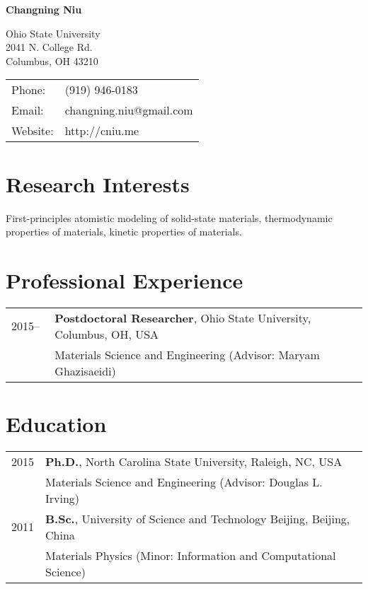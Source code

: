 \documentclass[letterpaper,11pt]{article}
\def\name{Changning Niu}
\begin{document}
\thispagestyle{empty}
\centerline{\huge \bf \sc \name}

\vspace{0.25in}

\begin{minipage}{0.50\linewidth}
  Ohio State University \\
  2041 N. College Rd.\\
  Columbus, OH 43210
\end{minipage}
\begin{minipage}{0.50\linewidth}
  \begin{tabular}{ll}
    Phone: & (919) 946-0183 \\
    Email: & changning.niu@gmail.com \\
    Website: & http://cniu.me \\
  \end{tabular}
\end{minipage}


\section*{Research Interests}

First-principles atomistic modeling of solid-state materials, thermodynamic properties of materials, kinetic properties of materials.

\section*{Professional Experience}

\begin{tabular}{ll}
2015--\,\,  & \textbf{Postdoctoral Researcher}, Ohio State University, Columbus, OH, USA \\
		   & Materials Science and Engineering (Advisor: Maryam Ghazisaeidi)
\end{tabular}


\section*{Education}

\begin{tabular}{ll}
	2015 & {\bf Ph.D.}, North Carolina State University, Raleigh, NC, USA \\
	     & Materials Science and Engineering (Advisor: Douglas L. Irving) \\
	2011 & {\bf B.Sc.}, University of Science and Technology Beijing, Beijing, China \\
		 & Materials Physics (Minor: Information and Computational Science) \\
\end{tabular}
\end{document}
